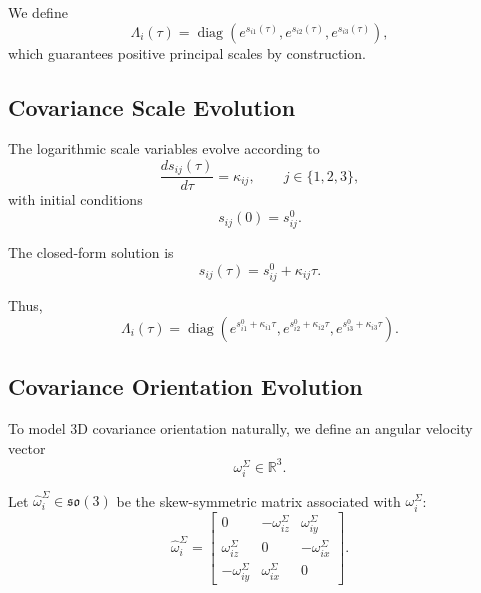\documentclass[11pt]{article}
\begin{document}
We define
\begin{equation}
\Lambda_i(\tau)
=
\operatorname{diag}
\left(
e^{s_{i1}(\tau)},
e^{s_{i2}(\tau)},
e^{s_{i3}(\tau)}
\right),
\end{equation}
which guarantees positive principal scales by construction.

\subsection{Covariance Scale Evolution}

The logarithmic scale variables evolve according to
\begin{equation}
\frac{d s_{ij}(\tau)}{d\tau}
=
\kappa_{ij},
\qquad
j\in\{1,2,3\},
\end{equation}
with initial conditions
\begin{equation}
s_{ij}(0)=s_{ij}^0.
\end{equation}

The closed-form solution is
\begin{equation}
s_{ij}(\tau)=s_{ij}^0+\kappa_{ij}\tau.
\end{equation}

Thus,
\begin{equation}
\Lambda_i(\tau)
=
\operatorname{diag}
\left(
e^{s_{i1}^0+\kappa_{i1}\tau},
e^{s_{i2}^0+\kappa_{i2}\tau},
e^{s_{i3}^0+\kappa_{i3}\tau}
\right).
\end{equation}

\subsection{Covariance Orientation Evolution}

To model 3D covariance orientation naturally, we define an angular velocity vector
\begin{equation}
\omega_i^\Sigma\in\mathbb{R}^3.
\end{equation}

Let $\widehat{\omega}_i^\Sigma\in\mathfrak{so}(3)$ be the skew-symmetric matrix associated with $\omega_i^\Sigma$:
\begin{equation}
\widehat{\omega}_i^\Sigma
=
\begin{bmatrix}
0 & -\omega_{iz}^\Sigma & \omega_{iy}^\Sigma\\
\omega_{iz}^\Sigma & 0 & -\omega_{ix}^\Sigma\\
-\omega_{iy}^\Sigma & \omega_{ix}^\Sigma & 0
\end{bmatrix}.
\end{equation}
\end{document}
